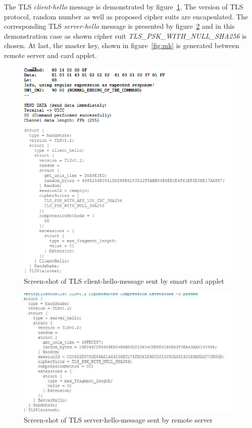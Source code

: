 The TLS \emph{client-hello} message is demonstrated by figure~\ref{fig:client-hello}. The version of TLS protocol, random number as well as proposed cipher suits are encapsulated.   The corresponding TLS \emph{server-hello} message is presented by figure~\ref{fig:server-hello} and in this demonstration case as shown cipher suit \emph{TLS\_PSK\_WITH\_NULL\_SHA256} is chosen. At last, the master key, shown in figure~\ref{fig:mk} is generated between remote server and card applet.

\begin{figure}[!htb]
	\centering
	\includegraphics[width=1\textwidth]{Images/impl/client-hallo.png}
		\caption{Screen-shot of TLS client-hello-message sent by smart card applet}
	\label{fig:client-hello}
\end{figure}

\begin{figure}[!htb]
	\centering
	\includegraphics[width=1\textwidth]{Images/impl/ServerHallo.jpg}
		\caption{Screen-shot of TLS server-hello-message sent by remote server}
	\label{fig:server-hello}
\end{figure}

